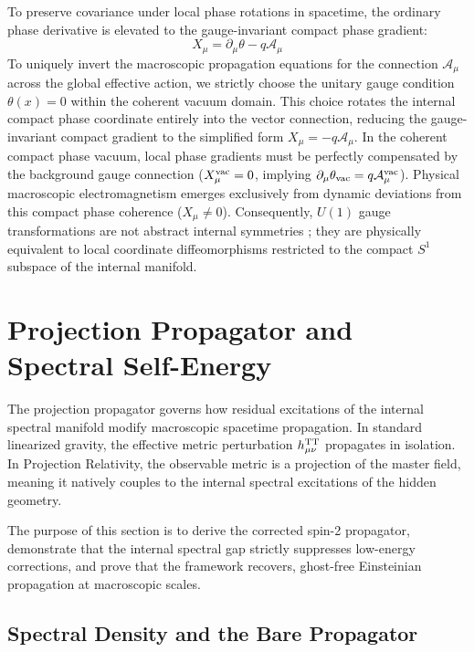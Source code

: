 \documentclass[11pt]{article}
\begin{document}
To preserve covariance under local phase rotations in spacetime, the ordinary phase derivative is elevated to the gauge-invariant compact phase gradient:
\begin{equation}
\boxed{ X_\mu = \partial_\mu \theta - q\mathcal A_\mu }
\end{equation}
To uniquely invert the macroscopic propagation equations for the connection $\mathcal{A}_{\mu}$ across the global effective action, we strictly choose the unitary gauge condition $\theta(x) = 0$ within the coherent vacuum domain. This choice rotates the internal compact phase coordinate entirely into the vector connection, reducing the gauge-invariant compact gradient to the simplified form $X_{\mu} = -q\mathcal{A}_{\mu}$. In the coherent compact phase vacuum, local phase gradients must be perfectly compensated by the background gauge connection ($X_\mu^{\rm vac} = 0$, implying $\partial_\mu \theta_{\rm vac} = q\mathcal A_\mu^{\rm vac}$). Physical macroscopic electromagnetism emerges exclusively from dynamic deviations from this compact phase coherence ($X_\mu \neq 0$). Consequently, $U(1)$ gauge transformations are not abstract internal symmetries \cite{Trautman1970, WuYang1975}; they are physically equivalent to local coordinate diffeomorphisms restricted to the compact $S^1$ subspace of the internal manifold.

\section{Projection Propagator and Spectral Self-Energy}
\label{sec:projection_propagator}

The projection propagator governs how residual excitations of the internal spectral manifold modify macroscopic spacetime propagation. In standard linearized gravity, the effective metric perturbation $h_{\mu\nu}^{\rm TT}$ propagates in isolation. In Projection Relativity, the observable metric is a projection of the master field, meaning it natively couples to the internal spectral excitations of the hidden geometry. 

The purpose of this section is to derive the corrected spin-2 propagator, demonstrate that the internal spectral gap strictly suppresses low-energy corrections, and prove that the framework recovers, ghost-free Einsteinian propagation at macroscopic scales.

\subsection{Spectral Density and the Bare Propagator}
\label{sec:spectral_density}
\end{document}
